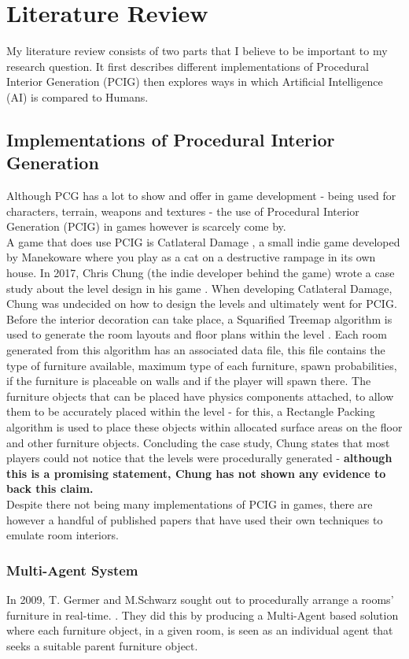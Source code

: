 \section{Literature Review}
My literature review consists of two parts that I believe to be important to my research question. It first describes different implementations of Procedural Interior Generation (PCIG) then explores ways in which Artificial Intelligence (AI) is compared to Humans.

\subsection{Implementations of Procedural Interior Generation}
Although PCG has a lot to show and offer in game development - being used for characters, terrain, weapons and textures - the use of Procedural Interior Generation (PCIG) in games however is scarcely come by.
\\
A game that does use PCIG is Catlateral Damage \cite{game:catlateral},
a small indie game developed by Manekoware where you play as a cat on a destructive rampage 
in its own house. In 2017, Chris Chung (the indie developer behind the game) wrote a case study about the level design in his game \cite{what-is-pcg}. When developing Catlateral Damage, Chung was undecided on how to design the levels and ultimately went for PCIG\cite{pcg_in_gd}.
Before the interior decoration can take place, a Squarified Treemap algorithm is used to generate the room layouts and floor plans within the level \cite{squarified-treemap}. Each room generated from this algorithm has an associated data file, this file contains the type of furniture available, maximum type of each furniture, spawn probabilities, if the furniture is placeable on walls and if the player will spawn there. The furniture objects that can be placed have physics components attached, to allow them to be accurately placed within the level - for this, a Rectangle Packing algorithm is used to place these objects within allocated surface areas on the floor and other furniture objects. Concluding the case study, Chung states that most players could not notice that the levels were procedurally generated -
\textbf{although this is a promising statement, Chung has not shown any evidence to back this claim.}
\\
Despite there not being many implementations of PCIG in games, there are however a handful of published papers that have used their own techniques to emulate room interiors.
\subsubsection*{Multi-Agent System}
In 2009, T. Germer and M.Schwarz sought out to procedurally arrange a rooms' furniture in real-time. \cite{real-time-walkthroughs}. They did this by producing a Multi-Agent based solution where each furniture object, in a given 
room, is seen as an individual agent that seeks a suitable parent furniture object.

